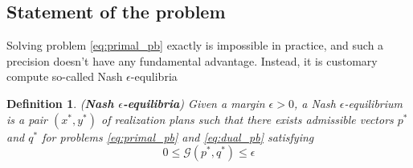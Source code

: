 \documentclass{article} %
\newtheorem{definition}[theorem]{Definition}
\begin{document}


\subsection{Statement of the problem}
Solving problem \eqref{eq:primal_pb} exactly is impossible in practice, and such a precision doesn't have any fundamental advantage. Instead, it is customary compute so-called Nash $\epsilon$-equlibria

\begin{definition}(\textbf{Nash $\epsilon$-equilibria})
Given a margin $\epsilon > 0$, a Nash $\epsilon$-equilibrium is a pair $(x^*, y^*)$ of realization plans such that there exists admissible vectors $p^*$ and $q^*$ for problems \eqref{eq:primal_pb} and \eqref{eq:dual_pb} satisfying
\begin{equation}
  0 \le \mathcal{G}(p^*, q^*) \le \epsilon
\label{eq:approx_pb}
\end{equation}
\end{definition}
\end{document}
